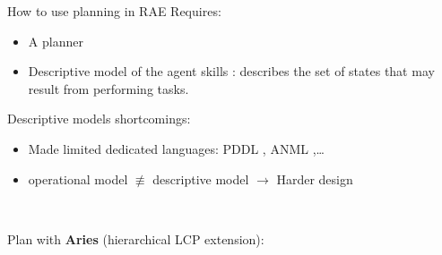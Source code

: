 \begin{frame}{How to use planning in RAE}
    Requires:
    \begin{itemize}
        \item A planner
        \item Descriptive model of the agent skills : describes the set of states that may result from performing tasks.
    \end{itemize} 

    Descriptive models shortcomings:
    \begin{itemize}
        \item Made limited dedicated languages: PDDL \cite{foxPDDL2ExtensionPDDL2003}, ANML \cite{smith2008anml},\dots
        \item operational model $\not\equiv$ descriptive model $\rightarrow$ Harder design
    \end{itemize}

    ~
    
    \centering

    Plan with \textbf{Aries} (hierarchical LCP\cite{bit-monnotConstraintBasedEncodingDomainIndependent2018} extension):

\end{frame}

